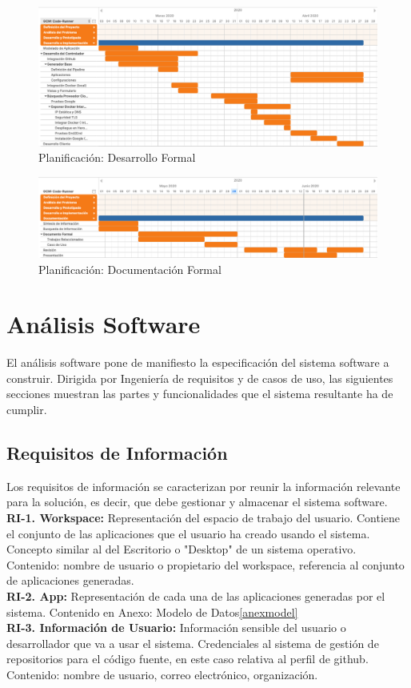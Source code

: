 \documentclass[a4paper,11pt]{book}
\begin{document}
\begin{figure}[H]
\centering
\includegraphics[scale=0.20]{imagenes/gant3.png}
\caption{ Planificación: Desarrollo Formal}
\end{figure}

\begin{figure}[H]
\centering
\includegraphics[scale=0.20]{imagenes/gant4.png}
\caption{ Planificación: Documentación Formal}
\end{figure}



\section{Análisis Software}

El análisis software pone de manifiesto la especificación del sistema software a construir. Dirigida por Ingeniería de requisitos y de casos de uso, las siguientes secciones muestran las partes y funcionalidades que el sistema resultante ha de cumplir.

\subsection{Requisitos de Información }
Los requisitos de información se caracterizan por reunir la información relevante para la solución, es decir, que debe gestionar y almacenar el sistema software.\\

\textbf{RI-1. Workspace:} Representación del espacio de trabajo del usuario. Contiene el conjunto de las aplicaciones que el usuario ha creado usando el sistema. Concepto similar al del Escritorio o "Desktop" de un sistema operativo.
Contenido: nombre de usuario o propietario del workspace, referencia al conjunto de aplicaciones generadas. \\
\textbf{RI-2. App:} Representación de cada una de las aplicaciones generadas por el sistema.
Contenido en Anexo: Modelo de Datos\ref{anexmodel}\\
\textbf{RI-3. Información de Usuario:} Información sensible del usuario o desarrollador que va a usar el sistema. Credenciales al sistema de gestión de repositorios para el código fuente, en este caso relativa al perfil de github.
Contenido: nombre de usuario, correo electrónico, organización. \\
\end{document}
